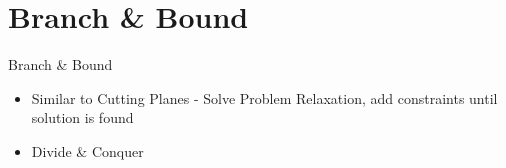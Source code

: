 \section{Branch \& Bound}

\begin{frame}{Branch \& Bound}
\begin{itemize}
\item Similar to Cutting Planes - Solve Problem Relaxation, add constraints until solution is found
\item Divide \& Conquer
\end{itemize}
\end{frame}
